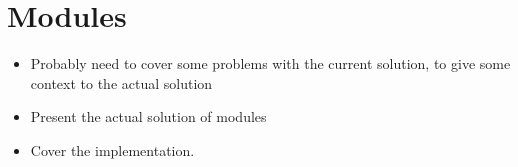 \section{Modules}

\begin{itemize}
\item Probably need to cover some problems with the current solution, to give
some context to the actual solution
\item Present the actual solution of modules
\item Cover the implementation.
\end{itemize}
